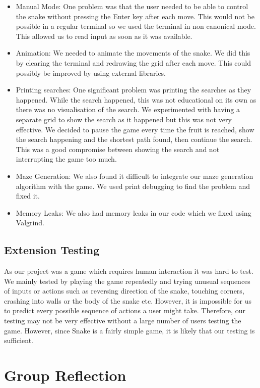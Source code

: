 \documentclass[11pt]{article}
\begin{document}
\begin{itemize}
    \item Manual Mode: One problem was that the user needed to be able to control the snake without pressing the Enter key after each move. This would not be possible in a regular terminal 
    so we used the terminal in non canonical mode. This allowed us to read input as soon as it was available.
    \item Animation: We needed to animate the movements of the snake. We did this by clearing the terminal and redrawing the grid after each move. This could possibly be improved by using external libraries.
    \item Printing searches: One significant problem was printing the searches as they happened. While the search happened, this was not educational on its own as there was no 
    visualisation of the search. We experimented with having a separate grid to show the search as it happened but this was not very effective. We decided to pause the game every time the fruit is reached, 
    show the search happening and the shortest path found, then continue the search. This was a good compromise between showing the search and not interrupting the game too much.
    \item Maze Generation: We also found it difficult to integrate our maze generation algorithm with the game. We used print debugging to find the problem and fixed it.
    \item Memory Leaks: We also had memory leaks in our code which we fixed using Valgrind.
\end{itemize}

\subsection{Extension Testing}
As our project was a game which requires human interaction it was hard to test. We mainly tested by playing the game repeatedly and trying unusual sequences of inputs or actions such as reversing direction of the snake, 
touching corners, crashing into walls or the body of the snake etc. However, it is impossible for us to predict every possible sequence of actions a user might take. Therefore, our testing may not be very effective without 
a large number of users testing the game. However, since Snake is a fairly simple game, it is likely that our testing is sufficient.

\section{Group Reflection}
\end{document}
